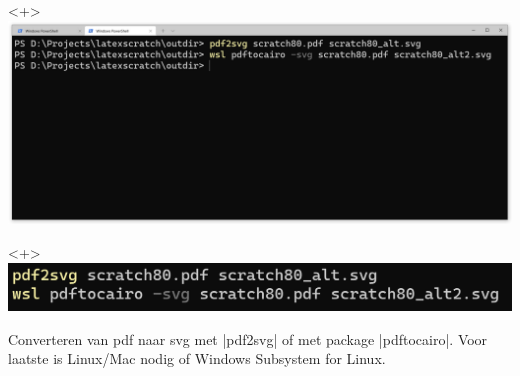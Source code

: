 \begin{frame}
    \begin{onlyenv}<+>
        \includegraphics[width=\textwidth,height=0.8\textheight,keepaspectratio]{assets/convert_pdf_to_svg.png}
    \end{onlyenv}
    \begin{onlyenv}<+>
        \includegraphics[width=\textwidth,height=0.8\textheight,keepaspectratio]{assets/convert_pdf_to_svg-small.png}
    \end{onlyenv}

    Converteren van pdf naar svg met \hll|pdf2svg| of met package \hll|pdftocairo|. Voor laatste
    is Linux/Mac nodig of Windows Subsystem for Linux.
\end{frame}

